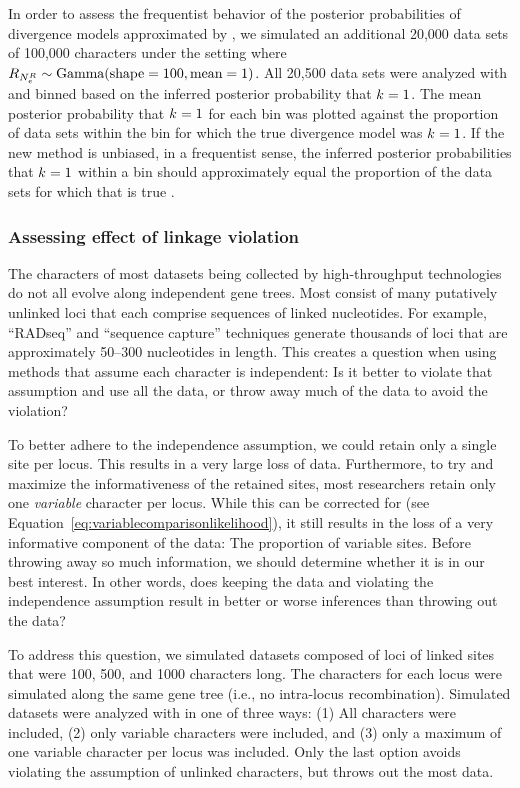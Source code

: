 In order to assess the frequentist behavior of the posterior probabilities of
divergence models approximated by \ecoevolity, we simulated an additional
20,000 data sets of 100,000 characters under the setting where
$R_{N_{e}^{R{}}} \sim \textrm{Gamma}(\textrm{shape} = 100, \textrm{mean} = 1)$.
All 20,500 data sets were analyzed with \ecoevolity and binned based on the
inferred posterior probability that $k_{} = 1$.
The mean posterior probability that $k_{} = 1$ for each bin was plotted
against the proportion of data sets within the bin for which the true
divergence model was $k_{} = 1$.
If the new method is unbiased, in a frequentist sense, the inferred posterior
probabilities that $k_{} = 1$ within a bin should approximately equal the
proportion of the data sets for which that is true
\citep{Huelsenbeck2004,Oaks2012,Oaks2014dpp}.

\subsubsection{Assessing effect of linkage violation}
The characters of most datasets being collected by high-throughput technologies
do not all evolve along independent gene trees.
Most consist of many putatively unlinked loci that each comprise sequences of
linked nucleotides.
For example, ``RADseq'' and ``sequence capture'' techniques generate thousands
of loci that are approximately 50--300 nucleotides in length.
This creates a question when using methods that assume each character is
independent:
Is it better to violate that assumption and use all the data, or throw
away much of the data to avoid the violation?

To better adhere to the independence assumption, we could retain only a single
site per locus.
This results in a very large loss of data.
Furthermore, to try and maximize the informativeness of the retained sites,
most researchers retain only one \emph{variable} character per locus.
While this can be corrected for (see
Equation~\ref{eq:variablecomparisonlikelihood}), it still results in the loss
of a very informative component of the data: The proportion of variable sites.
Before throwing away so much information, we should determine whether
it is in our best interest.
In other words, does keeping the data and violating the independence
assumption result in better or worse inferences than throwing out the 
data?

To address this question, 
we simulated datasets composed of loci of linked sites that were 100, 500, and
1000 characters long.
The characters for each locus were simulated along the same gene tree (i.e., no
intra-locus recombination).
Simulated datasets were analyzed with \ecoevolity in one of three ways:
(1) All characters were included,
(2) only variable characters were included,
and
(3) only a maximum of one variable character per locus was included.
Only the last option avoids violating the assumption of unlinked characters,
but throws out the most data.

